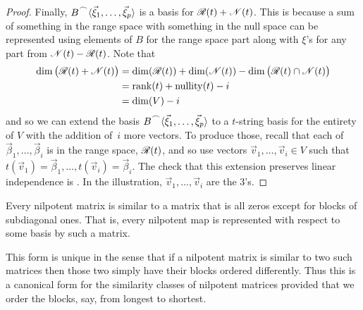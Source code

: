 \begin{proof}
Finally, \( \cat{B}{\sequence{\vec{\xi}_1,\dots,\vec{\xi}_p}} \)
is a basis for \( \mathscr{R}(t)+\mathscr{N}(t) \).
This is because a sum of 
something in the range space with something in the null space
can be represented using elements of \( B \) for the range space 
part along with $\xi$'s for any part from 
\( \mathscr{N}(t)-\mathscr{R}(t) \).
Note that
\begin{align*}
  \dim\big(\mathscr{R}(t)+\mathscr{N}(t)\big)
  &=
  \dim (\mathscr{R}(t))+\dim (\mathscr{N}(t))
    -\dim\big(\mathscr{R}(t)\cap\mathscr{N}(t)\big)  \\
  &=
  \operatorname{rank} (t)+\operatorname{nullity} (t)-i          \\
  &=
  \dim (V)-i
\end{align*}
and so we can extend the basis 
\( \cat{B}{\sequence{\vec{\xi}_1,\dots,\vec{\xi}_p}} \) 
to a $t$-string basis for the entirety of 
\( V \) with the addition of~\( i \) more vectors.
To produce those, 
recall that each of \( \vec{\beta}_1,\dots,\vec{\beta}_i \) is
in the range space, \( \mathscr{R}(t) \), 
and so use vectors
\( \vec{v}_1,\dots,\vec{v}_i\in V \) such that
\( t(\vec{v}_1)=\vec{\beta}_1,\dots,t(\vec{v}_i)=\vec{\beta}_i \).
The check that this extension preserves linear independence is
.
In the illustration, \( \vec{v}_1,\dots,\vec{v}_i \) are the \( 3 \)'s.
\end{proof}

\begin{corollary} \label{cor:NilpotentMatCanonForm}
Every nilpotent matrix is similar to a matrix that is all zeros
except for blocks of subdiagonal ones.
That is, every nilpotent map is represented with respect to some basis by
such a matrix.
\end{corollary}

This form is unique in the sense that if a nilpotent matrix is similar to two
such matrices then those two simply have their blocks ordered differently.
Thus this is
a canonical form for the similarity classes of nilpotent matrices
provided that we order the blocks, say, from longest to shortest.

